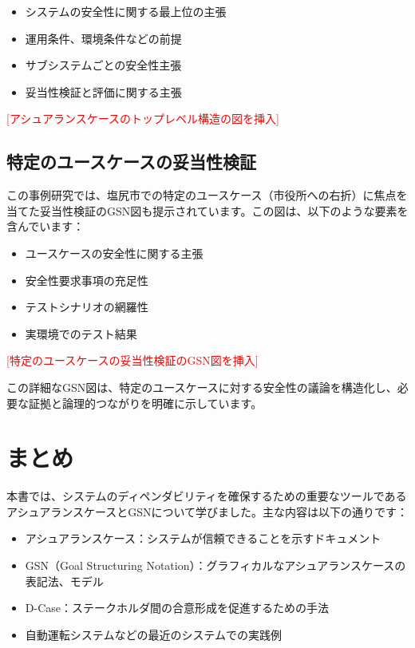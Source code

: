 \begin{itemize}
    \item システムの安全性に関する最上位の主張
    \item 運用条件、環境条件などの前提
    \item サブシステムごとの安全性主張
    \item 妥当性検証と評価に関する主張
\end{itemize}

\textcolor{red}{[アシュアランスケースのトップレベル構造の図を挿入]}

\subsection{特定のユースケースの妥当性検証}

この事例研究では、塩尻市での特定のユースケース（市役所への右折）に焦点を当てた妥当性検証のGSN図も提示されています。この図は、以下のような要素を含んでいます：

\begin{itemize}
    \item ユースケースの安全性に関する主張
    \item 安全性要求事項の充足性
    \item テストシナリオの網羅性
    \item 実環境でのテスト結果
\end{itemize}

\textcolor{red}{[特定のユースケースの妥当性検証のGSN図を挿入]}

この詳細なGSN図は、特定のユースケースに対する安全性の議論を構造化し、必要な証拠と論理的つながりを明確に示しています。

\section{まとめ}

本書では、システムのディペンダビリティを確保するための重要なツールであるアシュアランスケースとGSNについて学びました。主な内容は以下の通りです：

\begin{itemize}
    \item アシュアランスケース：システムが信頼できることを示すドキュメント
    \item GSN（Goal Structuring Notation）：グラフィカルなアシュアランスケースの表記法、モデル
    \item D-Case：ステークホルダ間の合意形成を促進するための手法
    \item 自動運転システムなどの最近のシステムでの実践例
\end{itemize}

